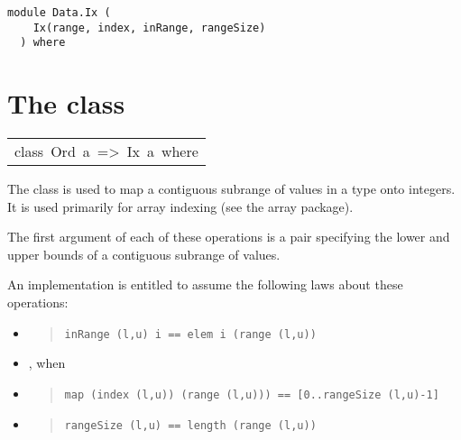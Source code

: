\label{module:Data.Ix}
\haddockbeginheader
{\haddockverb\begin{verbatim}
module Data.Ix (
    Ix(range, index, inRange, rangeSize)
  ) where\end{verbatim}}
\haddockendheader

\section{The  class
}
\begin{haddockdesc}
\item[\begin{tabular}{@{}l}
class\ Ord\ a\ =>\ Ix\ a\ where
\end{tabular}]\haddockbegindoc
The  class is used to map a contiguous subrange of values in
 a type onto integers.  It is used primarily for array indexing
 (see the array package).
\par
The first argument  of each of these operations is a pair
 specifying the lower and upper bounds of a contiguous subrange of values.
\par
An implementation is entitled to assume the following laws about these
 operations:
\par
\begin{itemize}
\item
\begin{quote}
{\haddockverb\begin{verbatim}
inRange (l,u) i == elem i (range (l,u))\end{verbatim}}
\end{quote}

\item
 , when 
\par

\item
\begin{quote}
{\haddockverb\begin{verbatim}
map (index (l,u)) (range (l,u))) == [0..rangeSize (l,u)-1]\end{verbatim}}
\end{quote}

\item
\begin{quote}
{\haddockverb\begin{verbatim}
rangeSize (l,u) == length (range (l,u))\end{verbatim}}
\end{quote}


\end{itemize}
\end{haddockdesc}
